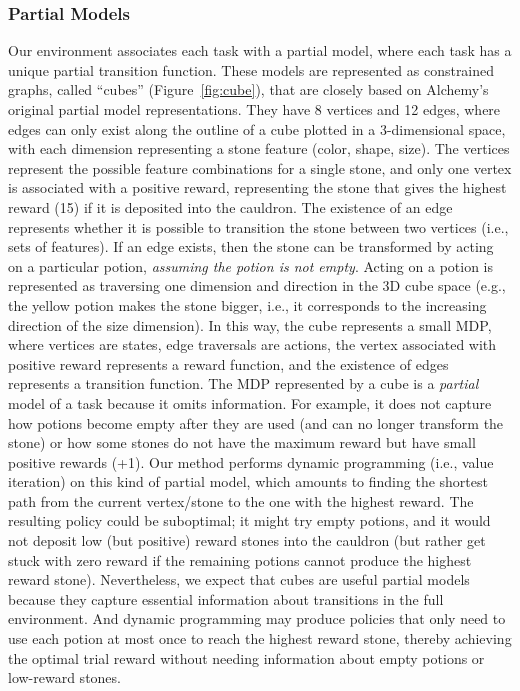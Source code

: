 \documentclass[sigconf]{aamas}
\begin{document}
\subsubsection{Partial Models} Our environment associates each task with a partial model, where each task has a unique partial transition function. These models are represented as constrained graphs, called ``cubes'' (Figure~\ref{fig:cube}), that are closely based on Alchemy's original partial model representations. They have 8 vertices and 12 edges, where edges can only exist along the outline of a cube plotted in a 3-dimensional space, with each dimension representing a stone feature (color, shape, size).
The vertices represent the possible feature combinations for a single stone, and only one vertex is associated with a positive reward, representing the stone that gives the highest reward (15) if it is deposited into the cauldron. The existence of an edge represents whether it is possible to transition the stone between two vertices (i.e., sets of features). If an edge exists, then the stone can be transformed by acting on a particular potion, \textit{assuming the potion is not empty}. Acting on a potion is represented as traversing one dimension and direction in the 3D cube space (e.g., the yellow potion makes the stone bigger, i.e.,  it corresponds to the increasing direction of the size dimension). In this way, the cube represents a small MDP, where vertices are states, edge traversals are actions, the vertex associated with positive reward represents a reward function, and the existence of edges represents a transition function.
The MDP represented by a cube is a \textit{partial} model of a task because it omits information. For example, it does not capture how potions become empty after they are used (and can no longer transform the stone) or how some stones do not have the maximum reward but have small positive rewards (+1). Our method performs dynamic programming (i.e., value iteration) on this kind of partial model, which amounts to finding the shortest path from the current vertex/stone to the one with the highest reward. The resulting policy could be suboptimal; it might try empty potions, and it would not deposit low (but positive) reward stones into the cauldron (but rather get stuck with zero reward if the remaining potions cannot produce the highest reward stone).
Nevertheless, we expect that cubes are useful partial models because they capture essential information about transitions in the full environment. And dynamic programming may produce policies that only need to use each potion at most once to reach the highest reward stone, thereby achieving the optimal trial reward without needing information about empty potions or low-reward stones.
\end{document}
